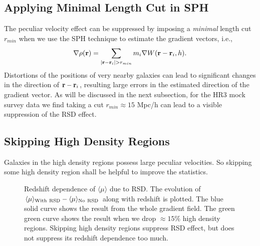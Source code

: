 \documentclass{emulateapj}
\begin{document}
 
\subsection{Applying Minimal Length Cut in SPH}
 
The peculiar velocity effect can be suppressed by imposing a {\it minimal} length cut $r_{min}$ 
when we use the SPH technique to estimate the gradient vectors, i.e., 
\begin{equation}
 \nabla\rho({\bf r}) = \sum_{|{\bf r}-{\bf r}_i|>r_{min}}
 m_i \nabla W({\bf r}-{\bf r}_i,h).
\end{equation}
Distortions of the positions of very nearby galaxies can lead to
significant changes in the direction of ${\bf r}-{\bf r}_i$, 
resulting large errors in the estimated direction of the gradient vector.
As will be discussed in the next subsection,
for the HR3 mock survey data we find taking a cut $r_{min}\approx15$ Mpc/h can lead to a visible suppression of the RSD effect.
 
\subsection{Skipping High Density Regions}

Galaxies in the high density regions possess large peculiar velocities.
So skipping some high density region shall be helpful to improve the statistics.

\begin{figure}[tpb]
   \caption{ \label{fig_mu_z} Redshift dependence of $\langle\mu\rangle$ due to RSD.
   The evolution of $\langle\mu\rangle_{\rm With\ RSD}-\langle\mu\rangle_{\rm No\ RSD}$ along with redshift is plotted.
   The blue solid curve shows the result from the whole gradient field.
   The green green curve shows the result when we drop $\approx15\%$ high density regions.
   Skipping high density regions suppress RSD effect, but does not suppress its redshift dependence too much.}
\end{figure}
\end{document}
